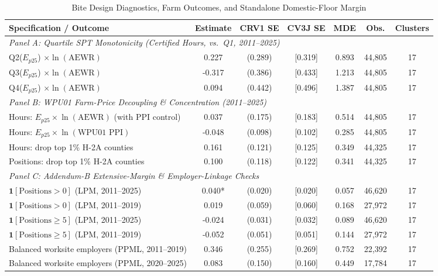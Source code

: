 \begin{table}[!htbp]
\centering
\caption{Bite Design Diagnostics, Farm Outcomes, and Standalone Domestic-Floor Margin}
\label{tab:bite_diagnostics}
\small
\begin{tabular}{lcccccc}
\toprule
Specification / Outcome & Estimate & CRV1 SE & CV3J SE & MDE & Obs. & Clusters \\
\midrule
\multicolumn{7}{l}{\textit{Panel A: Quartile SPT Monotonicity (Certified Hours, vs.\ Q1, 2011--2025)}} \\
Q2($E_{p25}$) $\times \ln(\text{AEWR})$ & 0.227 & (0.289) & [0.319] & 0.893 & 44,805 & 17 \\
Q3($E_{p25}$) $\times \ln(\text{AEWR})$ & -0.317 & (0.386) & [0.433] & 1.213 & 44,805 & 17 \\
Q4($E_{p25}$) $\times \ln(\text{AEWR})$ & 0.094 & (0.442) & [0.496] & 1.387 & 44,805 & 17 \\
\midrule
\multicolumn{7}{l}{\textit{Panel B: WPU01 Farm-Price Decoupling \& Concentration (2011--2025)}} \\
Hours: $E_{p25} \times \ln(\text{AEWR})$ (with PPI control) & 0.037 & (0.175) & [0.183] & 0.514 & 44,805 & 17 \\
Hours: $E_{p25} \times \ln(\text{WPU01 PPI})$ & -0.048 & (0.098) & [0.102] & 0.285 & 44,805 & 17 \\
Hours: drop top 1\% H-2A counties & 0.161 & (0.121) & [0.125] & 0.349 & 44,325 & 17 \\
Positions: drop top 1\% H-2A counties & 0.100 & (0.118) & [0.122] & 0.341 & 44,325 & 17 \\
\midrule
\multicolumn{7}{l}{\textit{Panel C: Addendum-B Extensive-Margin \& Employer-Linkage Checks}} \\
$\mathbf{1}[\text{Positions} > 0]$ (LPM, 2011--2025) & 0.040* & (0.020) & [0.020] & 0.057 & 46,620 & 17 \\
$\mathbf{1}[\text{Positions} > 0]$ (LPM, 2011--2019) & 0.019 & (0.059) & [0.060] & 0.168 & 27,972 & 17 \\
$\mathbf{1}[\text{Positions} \ge 5]$ (LPM, 2011--2025) & -0.024 & (0.031) & [0.032] & 0.089 & 46,620 & 17 \\
$\mathbf{1}[\text{Positions} \ge 5]$ (LPM, 2011--2019) & -0.052 & (0.051) & [0.051] & 0.144 & 27,972 & 17 \\
Balanced worksite employers (PPML, 2011--2019) & 0.346 & (0.255) & [0.269] & 0.752 & 22,392 & 17 \\
Balanced worksite employers (PPML, 2020--2025) & 0.083 & (0.150) & [0.160] & 0.449 & 17,784 & 17 \\

\end{tabular}
\end{table}
